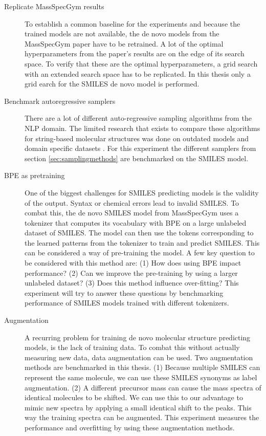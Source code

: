 \begin{description}
    \item[Replicate MassSpecGym results]
    To establish a common baseline for the experiments and because the trained models are not available, the de novo models from the MassSpecGym paper \cite{bushuiev2024massspecgym} have to be retrained.
    A lot of the optimal hyperparameters from the paper's results are on the edge of its search space.
    To verify that these are the optimal hyperparameters, a grid search with an extended search space has to be replicated.
    In this thesis only a grid earch for the SMILES de novo model is performed.
    
    \item[Benchmark autoregressive samplers]
    There are a lot of different auto-regressive sampling algorithms from the \ac{NLP} domain.
    The limited research that exists to compare these algorithms for string-based molecular structures was done on outdated models and domain specific datasets \cite{stravs2022msnovelist}.
    For this experiment the different samplers from section \ref{sec:samplingmethods} are benchmarked on the SMILES model.
    
    \item[\acf{BPE} as pretraining]
    One of the biggest challenges for SMILES predicting models is the validity of the output. Syntax or chemical errors lead to invalid SMILES.
    To combat this, the de novo SMILES model from MassSpecGym uses a tokenizer that computes its vocabulary with \ac{BPE} on a large unlabeled dataset of SMILES.
    The model can then use the tokens corresponding to the learned patterns from the tokenizer to train and predict SMILES.
    This can be considered a way of pre-training the model.
    A few key question to be considered with this method are: 
    (1) How does using \ac{BPE} impact performance?
    (2) Can we improve the pre-training by using a larger unlabeled dataset?
    (3) Does this method influence over-fitting?
    This experiment will try to answer these questions by benchmarking performance of SMILES models trained with different tokenizers.

    \item[Augmentation]
    A recurring problem for training de novo molecular structure predicting models, is the lack of training data.
    To combat this without actually measuring new data, data augmentation can be used. 
    Two augmentation methods are benchmarked in this thesis.
    (1) Because multiple SMILES can represent the same molecule, we can use these SMILES synonyms as label augmentation.
    (2) A different precursor mass can cause the mass spectra of identical molecules to be shifted.
    We can use this to our advantage to mimic new spectra by applying a small identical shift to the peaks.
    This way the training spectra can be augmented.
    This experiment measures the performance and overfitting by using these augmentation methods.


\end{description}
